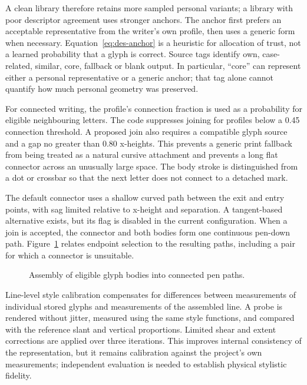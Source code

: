 A clean library therefore retains more sampled personal variants; a library with poor descriptor agreement uses stronger anchors. The anchor first prefers an acceptable representative from the writer's own profile, then uses a generic form when necessary. Equation~\ref{eq:des-anchor} is a heuristic for allocation of trust, not a learned probability that a glyph is correct. Source tags identify own, case-related, similar, core, fallback or blank output. In particular, ``core'' can represent either a personal representative or a generic anchor; that tag alone cannot quantify how much personal geometry was preserved.

For connected writing, the profile's connection fraction is used as a probability for eligible neighbouring letters. The code suppresses joining for profiles below a 0.45 connection threshold. A proposed join also requires a compatible glyph source and a gap no greater than 0.80 x-heights. This prevents a generic print fallback from being treated as a natural cursive attachment and prevents a long flat connector across an unusually large space. The body stroke is distinguished from a dot or crossbar so that the next letter does not connect to a detached mark.

The default connector uses a shallow curved path between the exit and entry points, with sag limited relative to x-height and separation. A tangent-based alternative exists, but its flag is disabled in the current configuration. When a join is accepted, the connector and both bodies form one continuous pen-down path. Figure~\ref{fig:des-joins} relates endpoint selection to the resulting paths, including a pair for which a connector is unsuitable.


\begin{figure}[!htbp]\centering
{}
\caption{Assembly of eligible glyph bodies into connected pen paths.}
\label{fig:des-joins}
\end{figure}

Line-level style calibration compensates for differences between measurements of individual stored glyphs and measurements of the assembled line. A probe is rendered without jitter, measured using the same style functions, and compared with the reference slant and vertical proportions. Limited shear and extent corrections are applied over three iterations. This improves internal consistency of the representation, but it remains calibration against the project's own measurements; independent evaluation is needed to establish physical stylistic fidelity.

